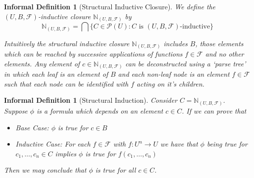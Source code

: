 \documentclass[12pt]{article}
\theoremstyle{break}
\theoremstyle{break}
\theoremstyle{break}
\theoremstyle{break}
\theoremstyle{break}
\newtheorem{informal definition}[definition]{Informal Definition}
\newcommand{\NUBF}[0]{\mathbb{N}_{(U, B, \mathcal{F})}}
\begin{document}
\begin{informal definition}[Structural Inductive Closure]
We define the $(U, B, \mathcal{F})$-inductive closure $\mathbb{N}_{(U, B, \mathcal{F})}$ by
$$
\NUBF = \bigcap \{C \in \mathcal{P}(U): C \text{ is } (U, B, \mathcal{F})\text{-inductive} \}
$$

Intuitively the structural inductive closure $\NUBF$ includes $B$, those elements which can be reached by successive applications of functions $f\in \mathcal{F}$ and no other elements.
Any element of $c \in \NUBF$ can be deconstructed using a `parse tree' in which each leaf is an element of $B$ and each non-leaf node is an element $f \in \mathcal{F}$ such that each node can be identified with $f$ acting on it's children.
\end{informal definition}

\begin{informal definition}[Structural Induction]
Consider $C = \NUBF$.
Suppose $\phi$ is a formula which depends on an element $c\in C$.
If we can prove that

\begin{itemize}
\item{Base Case: $\phi$ is true for $c \in B$}
\item{Inductive Case: For each $f\in \mathcal{F}$ with $f:U^n \to U$ we have that $\phi$ being true for $c_1, \ldots, c_n \in C$ implies $\phi$ is true for $f(c_1, \ldots, c_n)$}
\end{itemize}

Then we may conclude that $\phi$ is true for all $c\in C$.

\end{informal definition}
\end{document}
